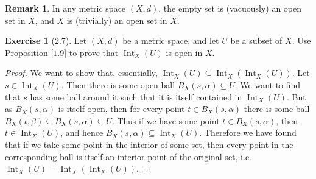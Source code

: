 \documentclass[9pt,reqno]{amsart}
\theoremstyle{definition}
\newtheorem{exercise}{Exercise}[section]
\newtheorem{rem}{Remark}[section]
\DeclareMathOperator{\Int}{Int}
\begin{document}
\begin{rem}
In any metric space $(X,d)$, the empty set is (vacuously) an open set in $X$, and $X$ is (trivially) an open set in $X$. 
\end{rem}
\begin{exercise}[2.7]Let $(X,d)$ be a metric space, and let $U$ be a subset of $X$. Use Proposition [$1.9$] to prove that $\Int _ X (U)$ is open in $X$.
\end{exercise}
\begin{proof}
	We want to show that, essentially, $\Int_X(U) \subseteq \Int_X(\Int_X(U))$. Let $s \in \Int_X(U)$. Then there is some open ball $B_X(s, \alpha) \subseteq U$. We want to find that $s$ has some ball around it such that it is itself contained in $\Int_X(U)$. But as $B_X(s, \alpha)$ is itself open, then for every point $t \in B_X(s, \alpha)$ there is some ball $B_X(t,\beta) \subseteq B_X(s, \alpha) \subseteq U$. Thus if we have some point $t \in B_X(s, \alpha)$, then $t \in \Int_X(U)$, and hence $B_X(s, \alpha) \subseteq \Int_X(U)$. Therefore we have found that if we take some point in the interior of some set, then every point in the corresponding ball is itself an interior point of the original set, i.e. $\Int_X(U) = \Int_X( \Int_X(U))$. 
\end{proof}
\end{document}
